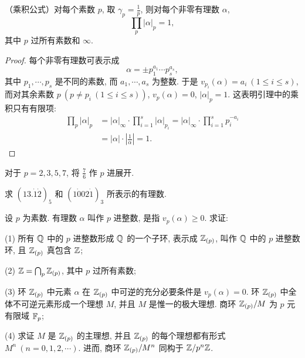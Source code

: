 \begin{lemma}\label{lem:ch7-1}
（乘积公式）对每个素数 $p$, 取 $\gamma_p=\frac{1}{p}$, 则对每个非零有理数 $\alpha$,
\[
  \prod_p|\alpha|_p=1,
\]
其中 $p$ 过所有素数和 $\infty$.
\end{lemma}

\begin{proof}
每个非零有理数可表示成
\[
  \alpha=\pm p_1^{a_1}\cdots p_s^{a_s},
\]
其中 $p_1,\cdots,p_s$ 是不同的素数, 而 $a_1,\cdots,a_s$ 为整数. 于是 $v_{p_i}(\alpha)=a_i\ (1\leqslant i\leqslant s)$, 而对其余素数 $p\ (p\neq p_i\ (1\leqslant i\leqslant s))$, $v_p(\alpha)=0$, $|\alpha|_p=1$. 这表明引理中的乘积只有有限项:
\begin{align*}
  \prod_p|\alpha|_p&=|\alpha|_{\infty}\cdot\prod_{i=1}^{s}|\alpha|_{p_i}=|\alpha|_{\infty}\cdot\prod_{i=1}^{s}p_i^{-a_i}\\
  &=|\alpha|\cdot\left|\frac{1}{\alpha}\right|=1.
\end{align*}
\end{proof}

\begin{Exercises}
\item 对于 $p=2,3,5,7$, 将 $\frac{7}{6}$ 作 $p$ 进展开.

\item 求 $(13.\dot{1}\dot{2})_5$ 和 $(1\dot{0}02\dot{1})_3$ 所表示的有理数.

\item 设 $p$ 为素数. 有理数 $\alpha$ 叫作 $p$ 进整数, 是指 $v_p(\alpha)\geqslant 0$. 求证:

(1) 所有 $\mathbb{Q}$ 中的 $p$ 进整数形成 $\mathbb{Q}$ 的一个子环, 表示成 $\mathbb{Z}_{(p)}$, 叫作 $\mathbb{Q}$ 中的 $p$ 进整数环, 且 $\mathbb{Z}_{(p)}$ 真包含 $\mathbb{Z}$;

(2) $\mathbb{Z}=\bigcap_p\mathbb{Z}_{(p)}$, 其中 $p$ 过所有素数;

(3) 环 $\mathbb{Z}_{(p)}$ 中元素 $\alpha$ 在 $\mathbb{Z}_{(p)}$ 中可逆的充分必要条件是 $v_p(\alpha)=0$. 环 $\mathbb{Z}_{(p)}$ 中全体不可逆元素形成一个理想 $M$, 并且 $M$ 是惟一的极大理想. 商环 $\mathbb{Z}_{(p)}/M$ 为 $p$ 元有限域 $\mathbb{F}_p$;

(4) 求证 $M$ 是 $\mathbb{Z}_{(p)}$ 的主理想, 并且 $\mathbb{Z}_{(p)}$ 的每个理想都有形式 $M^n\ (n=0,1,2,\cdots)$. 进而, 商环 $\mathbb{Z}_{(p)}/M^n$ 同构于 $\mathbb{Z}/p^n\mathbb{Z}$.
\end{Exercises}
